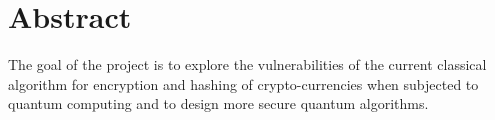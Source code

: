 \section*{Abstract}
The goal of the project is to explore the vulnerabilities of the current classical algorithm for encryption and hashing of crypto-currencies when subjected to quantum computing and to design more secure quantum algorithms. 